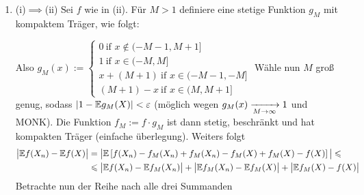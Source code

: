 \documentclass[11pt]{report}
\begin{document}
\begin{enumerate}[label=\Roman*. ]
    \item (i)$\implies$(ii)\newline
    Sei $f$ wie in (ii). F\"ur $M>1$ definiere eine stetige Funktion $g_M$ mit kompaktem Tr\"ager, wie folgt: \newline \newline
    \newline
    Also $g_M(x):=
            \begin{cases}
                0 \ \text{if } x\notin(-M-1,M+1]\\
                1 \ \text{if } x\in(-M,M]\\
                x+(M+1) \ \text{if } x\in(-M-1,-M]\\
                (M+1)-x \ \text{if } x\in(M,M+1]
            \end{cases}$
    \newline\newline\newline
    W\"ahle nun $M$ gro\ss{} genug, sodass $|1-\mathbb{E} g_M(X)|<\varepsilon$ (m\"oglich wegen $g_M(x)\nto{}{M\to\infty}1$ und MONK). Die Funktion $f_M:=f\cdot g_M$ ist dann stetig, beschr\"ankt und hat kompakten Tr\"ager (einfache \"uberlegung). Weiters folgt
    \begin{align*}
        \big|\mathbb{E} f(X_n)-\mathbb{E} f(X)\big| &=\big| \mathbb{E} \left[f(X_n)-f_M(X_n)+f_M(X_n)-f_M(X)+f_M(X)-f(X)\right]\big| \leqslant \\
        &\leqslant \big|\mathbb{E} f(X_n)-\mathbb{E} f_M(X_n)\big|+\big|\mathbb{E} f_M(X_n)-\mathbb{E} f_M(X)\big|+\big|\mathbb{E} f_M(X)-f(X)\big|
    \end{align*}
    Betrachte nun der Reihe nach alle drei Summanden

\end{enumerate}
\end{document}

